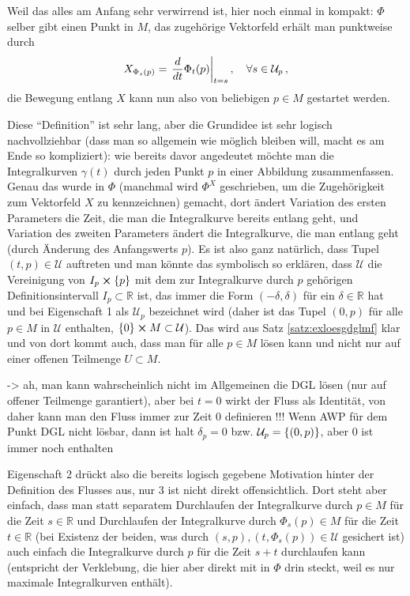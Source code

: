 \documentclass[../H_Analysis_main.tex]{subfiles}
\begin{document}
Weil das alles am Anfang sehr verwirrend ist, hier noch einmal in kompakt: $\Phi$ selber gibt einen Punkt in $M$, das zugehörige Vektorfeld erhält man punktweise durch
\begin{equation}
X_{\Phi_s(p)} = \eval{\dv{t} \Phi_t(p)}_{t = s}, \quad \forall s \in \mathcal{U}_p \, ,
\end{equation}
die Bewegung entlang $X$ kann nun also von beliebigen $p \in M$ gestartet werden.

Diese \enquote{Definition} ist sehr lang, aber die Grundidee ist sehr logisch nachvollziehbar (dass man so allgemein wie möglich bleiben will, macht es am Ende so kompliziert): wie bereits davor angedeutet möchte man die Integralkurven $\gamma(t)$ durch jeden Punkt $p$ in einer Abbildung zusammenfassen. Genau das wurde in $\Phi$ (manchmal wird $\Phi^X$ geschrieben, um die Zugehörigkeit zum Vektorfeld $X$ zu kennzeichnen) gemacht, dort ändert Variation des ersten Parameters die Zeit, die man die Integralkurve bereits entlang geht, und Variation des zweiten Parameters ändert die Integralkurve, die man entlang geht (durch Änderung des Anfangswerts $p$). Es ist also ganz natürlich, dass Tupel $(t, p) \in \mathcal{U}$ auftreten und man könnte das symbolisch so erklären, dass $\mathcal{U}$ die Vereinigung von $I_p \cross \qty{p}$ mit dem zur Integralkurve durch $p$ gehörigen Definitionsintervall $I_p \subset \mathbb{R}$ ist, das immer die Form $(-\delta, \delta)$ für ein $\delta \in \mathbb{R}$ hat und bei Eigenschaft 1 als $\mathcal{U}_p$ bezeichnet wird (daher ist das Tupel $(0, p)$ für alle $p \in M$ in $\mathcal{U}$ enthalten, $\qty{0} \cross M \subset \mathcal{U}$). Das wird aus Satz \ref{satz:exloesgdglmf} klar und von dort kommt auch, dass man für alle $p \in M$ lösen kann und nicht nur auf einer offenen Teilmenge $U \subset M$.

-> ah, man kann wahrscheinlich nicht im Allgemeinen die DGL lösen (nur auf offener Teilmenge garantiert), aber bei $t = 0$ wirkt der Fluss als Identität, von daher kann man den Fluss immer zur Zeit 0 definieren !!! Wenn AWP für dem Punkt DGL nicht lösbar, dann ist halt $\delta_p = 0$ bzw. $\mathcal{U}_p = \qty{(0, p)}$, aber 0 ist immer noch enthalten


Eigenschaft 2 drückt also die bereits logisch gegebene Motivation hinter der Definition des Flusses aus, nur 3 ist nicht direkt offensichtlich. Dort steht aber einfach, dass man statt separatem Durchlaufen der Integralkurve durch $p \in M$ für die Zeit $s \in \mathbb{R}$ und Durchlaufen der Integralkurve durch $\Phi_s(p) \in M$ für die Zeit $t \in \mathbb{R}$ (bei Existenz der beiden, was durch $(s, p), (t, \Phi_s(p)) \in \mathcal{U}$ gesichert ist) auch einfach die Integralkurve durch $p$ für die Zeit $s + t$ durchlaufen kann (entspricht der Verklebung, die hier aber direkt mit in $\Phi$ drin steckt, weil es nur maximale Integralkurven enthält).
\end{document}
